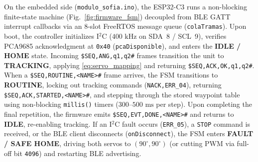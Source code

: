 \documentclass[lettersize,journal]{IEEEtran}
\begin{document}
	On the embedded side (\texttt{modulo\_sofia.ino}), the ESP32-C3 runs a non-blocking finite-state machine (Fig.~\ref{fig:firmware_fsm}) decoupled from BLE GATT interrupt callbacks via an 8-slot FreeRTOS message queue (\texttt{colaTramas}). Upon boot, the controller initializes I$^2$C ($400\text{ kHz}$ on SDA~8 / SCL~9), verifies PCA9685 acknowledgment at \texttt{0x40} (\texttt{pcaDisponible}), and enters the \textbf{IDLE / HOME} state. Incoming \texttt{\$SEQ,ANG,q1,q2\#} frames transition the unit to \textbf{TRACKING}, applying \eqref{eq:servo_mapping} and returning \texttt{\$SEQ,ACK,OK,q1,q2\#}. When a \texttt{\$SEQ,ROUTINE,<NAME>\#} frame arrives, the FSM transitions to \textbf{ROUTINE}, locking out tracking commands (\texttt{NACK,ERR\_04}), returning \texttt{\$SEQ,ACK,STARTED,<NAME>\#}, and stepping through the stored waypoint table using non-blocking \texttt{millis()} timers ($300\text{--}500\text{ ms}$ per step). Upon completing the final repetition, the firmware emits \texttt{\$SEQ,EVT,DONE,<NAME>\#} and returns to \textbf{IDLE}, re-enabling tracking. If an I$^2$C fault occurs (\texttt{ERR\_05}), a \texttt{STOP} command is received, or the BLE client disconnects (\texttt{onDisconnect}), the FSM enters \textbf{FAULT / SAFE HOME}, driving both servos to $(90^\circ, 90^\circ)$ (or cutting PWM via full-off bit \texttt{4096}) and restarting BLE advertising.
	
\end{document}

